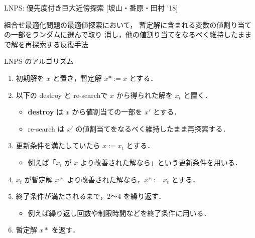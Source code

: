 \documentclass[11pt,dvipdfmx]{beamer}
\begin{document}
\begin{frame}{LNPS: 優先度付き巨大近傍探索 [坡山・番原・田村 '18]}
  \begin{alertblock}{}\centering
    組合せ最適化問題の最適値探索において，
    暫定解に含まれる変数の値割り当ての一部をランダムに選んで取り
    消し，他の値割り当てをなるべく維持したままで解を再探索する反復手法
  \end{alertblock}
  \pause
  \begin{block}{\small LNPS のアルゴリズム}
    \begin{enumerate}
      \compress
      \item 初期解を $x$ と置き，暫定解 $x* := x$ とする．
      \item 以下の destroy と re-searchで $x$ から得られた解を $x_t$ と置く．
      \begin{itemize}
        \compress
        \item \alert{\bf destroy} は $x$ から値割当ての一部を $x'$ とする．
        \item re-search は $x'$ の値割当てをなるべく維持したまま再探索する．
      \end{itemize}
      \item 更新条件を満たしていたら $x := x_t$ とする．
      \begin{itemize}
        \item 例えば「$x_t$ が $x$ より改善された解なら」という更新条件を用いる．
      \end{itemize}
      \item $x_t$ が暫定解 $x*$ より改善された解なら，$x* := x_t$ とする．
      \item 終了条件が満たされるまで，2〜4 を繰り返す．
      \begin{itemize}
        \item 例えば繰り返し回数や制限時間などを終了条件に用いる．
      \end{itemize}
      \item 暫定解 $x*$ を返す．
    \end{enumerate}
  \end{block}
\end{frame}
\end{document}
